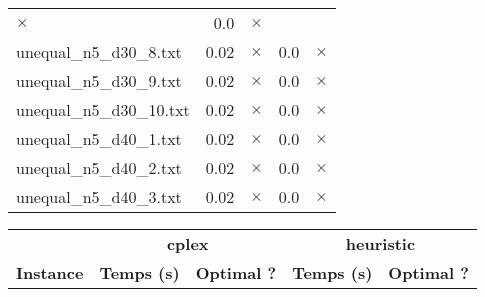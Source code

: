\documentclass{article}
\begin{document}
\begin{center}
\begin{tabular}{lrrrr}
$\times$
 & 0.0 & 
$\times$
\\
unequal\_n5\_d30\_8.txt & 0.02 & 
$\times$
 & 0.0 & 
$\times$
\\
unequal\_n5\_d30\_9.txt & 0.02 & 
$\times$
 & 0.0 & 
$\times$
\\
unequal\_n5\_d30\_10.txt & 0.02 & 
$\times$
 & 0.0 & 
$\times$
\\
unequal\_n5\_d40\_1.txt & 0.02 & 
$\times$
 & 0.0 & 
$\times$
\\
unequal\_n5\_d40\_2.txt & 0.02 & 
$\times$
 & 0.0 & 
$\times$
\\
unequal\_n5\_d40\_3.txt & 0.02 & 
$\times$
 & 0.0 & 
$\times$
\\
\hline\end{tabular}
\end{center}

\newpage
\begin{center}
\renewcommand{\arraystretch}{1.4} 
 \begin{tabular}{lrrrr}
	\hline
 & \multicolumn{2}{c}{\textbf{cplex}} & \multicolumn{2}{c}{\textbf{heuristic}}\\
\textbf{Instance}  & \textbf{Temps (s)} & \textbf{Optimal ?}  & \textbf{Temps (s)} & \textbf{Optimal ?} \\\hline


\end{tabular}
\end{center}
\end{document}
